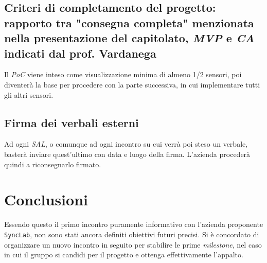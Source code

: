 \documentclass[8pt]{article}
\newcommand{\signatureline}[1]{%
	 \par\vspace{0.5cm}
	\noindent\makebox[\linewidth][r]{\rule{0.2\textwidth}{0.5pt}\hspace{3cm}\makebox[0pt][r]{\vspace{3pt}\footnotesize #1}}%
}
\begin{document}
\subsection{Criteri di completamento del progetto: rapporto tra "consegna completa" menzionata nella presentazione del capitolato, \textit{MVP} e \textit{CA} indicati dal prof. Vardanega}
Il \textit{PoC} viene inteso come visualizzazione minima di almeno 1/2 sensori, poi diventerà la base per procedere con la parte successiva, in cui implementare tutti gli altri sensori.

\subsection{Firma dei verbali esterni}
Ad ogni \textit{SAL}, o comunque ad ogni incontro su cui verrà poi steso un verbale, basterà inviare quest'ultimo con data e luogo della firma. L'azienda procederà quindi a riconsegnarlo firmato.

\section{Conclusioni}
Essendo questo il primo incontro puramente informativo con l'azienda proponente \texttt{SyncLab}, non sono stati ancora definiti obiettivi futuri precisi. Si è concordato di organizzare un nuovo incontro in seguito per stabilire le prime \textit{milestone}, nel caso in cui il gruppo si candidi per il progetto e ottenga effettivamente l'appalto.\\\\

\signatureline{Padova, 2024-03-22}
\end{document}

